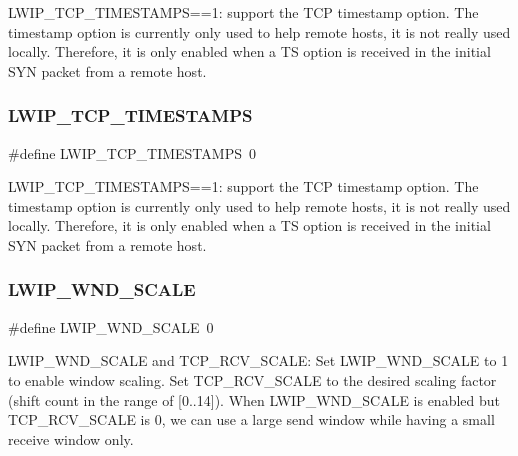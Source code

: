 L\+W\+I\+P\+\_\+\+T\+C\+P\+\_\+\+T\+I\+M\+E\+S\+T\+A\+M\+PS==1\+: support the T\+CP timestamp option. The timestamp option is currently only used to help remote hosts, it is not really used locally. Therefore, it is only enabled when a TS option is received in the initial S\+YN packet from a remote host. \mbox{\label{group__lwip__opts__tcp_ga249bc450bb818cf2ef3cf1472ff354fd}} 
\subsubsection{\texorpdfstring{L\+W\+I\+P\+\_\+\+T\+C\+P\+\_\+\+T\+I\+M\+E\+S\+T\+A\+M\+PS}{LWIP\_TCP\_TIMESTAMPS}\hspace{0.1cm}{\footnotesize\ttfamily [2/2]}}
{\footnotesize\ttfamily \#define L\+W\+I\+P\+\_\+\+T\+C\+P\+\_\+\+T\+I\+M\+E\+S\+T\+A\+M\+PS~0}

L\+W\+I\+P\+\_\+\+T\+C\+P\+\_\+\+T\+I\+M\+E\+S\+T\+A\+M\+PS==1\+: support the T\+CP timestamp option. The timestamp option is currently only used to help remote hosts, it is not really used locally. Therefore, it is only enabled when a TS option is received in the initial S\+YN packet from a remote host. \mbox{\label{group__lwip__opts__tcp_ga88dbbfeeeb41b129fdc8235fc08bb530}} 
\subsubsection{\texorpdfstring{L\+W\+I\+P\+\_\+\+W\+N\+D\+\_\+\+S\+C\+A\+LE}{LWIP\_WND\_SCALE}\hspace{0.1cm}{\footnotesize\ttfamily [1/2]}}
{\footnotesize\ttfamily \#define L\+W\+I\+P\+\_\+\+W\+N\+D\+\_\+\+S\+C\+A\+LE~0}

L\+W\+I\+P\+\_\+\+W\+N\+D\+\_\+\+S\+C\+A\+LE and T\+C\+P\+\_\+\+R\+C\+V\+\_\+\+S\+C\+A\+LE\+: Set L\+W\+I\+P\+\_\+\+W\+N\+D\+\_\+\+S\+C\+A\+LE to 1 to enable window scaling. Set T\+C\+P\+\_\+\+R\+C\+V\+\_\+\+S\+C\+A\+LE to the desired scaling factor (shift count in the range of \mbox{[}0..14\mbox{]}). When L\+W\+I\+P\+\_\+\+W\+N\+D\+\_\+\+S\+C\+A\+LE is enabled but T\+C\+P\+\_\+\+R\+C\+V\+\_\+\+S\+C\+A\+LE is 0, we can use a large send window while having a small receive window only. \mbox{\label{group__lwip__opts__tcp_ga88dbbfeeeb41b129fdc8235fc08bb530}} 
